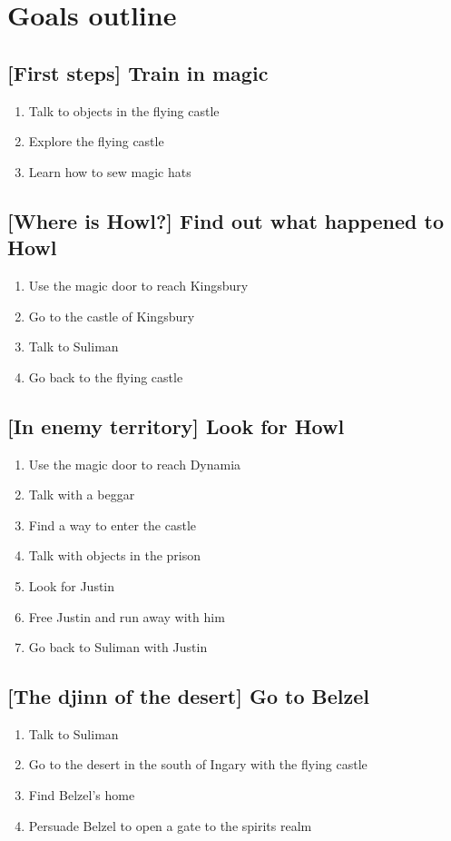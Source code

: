 \section{Goals outline}

\subsection{[First steps] Train in magic}
\begin{enumerate}
\item Talk to objects in the flying castle
\item Explore the flying castle
\item Learn how to sew magic hats
\end{enumerate}

\subsection{[Where is Howl?] Find out what happened to Howl}
\begin{enumerate}
\item Use the magic door to reach Kingsbury
\item Go to the castle of Kingsbury
\item Talk to Suliman
\item Go back to the flying castle
\end{enumerate}

\subsection{[In enemy territory] Look for Howl}
\begin{enumerate}
\item Use the magic door to reach Dynamia
\item Talk with a beggar
\item Find a way to enter the castle
\item Talk with objects in the prison
\item Look for Justin
\item Free Justin and run away with him
\item Go back to Suliman with Justin
\end{enumerate}

\subsection{[The djinn of the desert] Go to Belzel}
\begin{enumerate}
\item Talk to Suliman
\item Go to the desert in the south of Ingary with the flying castle
\item Find Belzel's home
\item Persuade Belzel to open a gate to the spirits realm
\end{enumerate}

